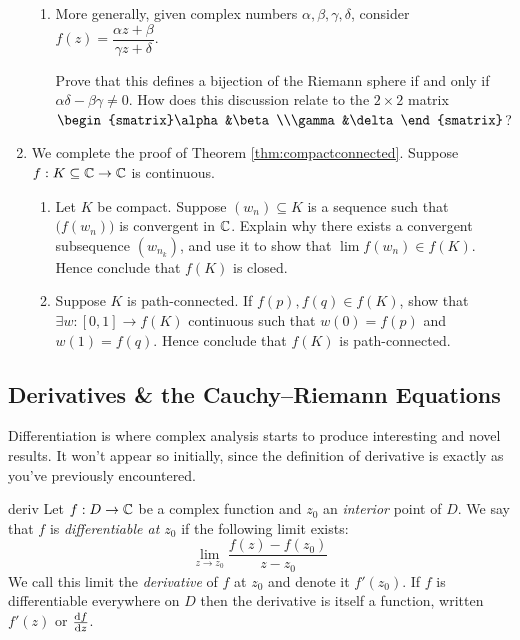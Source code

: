 \begin{exercises}{}{}
\begin{enumerate}
\begin{enumerate}
	  	\item More generally, given complex numbers $\alpha,\beta,\gamma,\delta$, consider $f(z)=\dfrac{\alpha z+\beta}{\gamma z+\delta}$.\par
	  	Prove that this defines a bijection of the Riemann sphere if and only if $\alpha\delta-\beta\gamma\neq 0$. How does this discussion relate to the $2\times 2$ matrix $\begin{smatrix}\alpha&\beta\\\gamma&\delta\end{smatrix}$?
	  \end{enumerate}
	  
	  
	  \item We complete the proof of Theorem \ref{thm:compactconnected}. Suppose $f:K\subseteq\C\to\C$ is continuous.
	  \begin{enumerate}
	    \item Let $K$ be compact. Suppose $(w_n)\subseteq K$ is a sequence such that $\bigl(f(w_n)\bigr)$ is convergent in $\C$. Explain why there exists a convergent subsequence $(w_{n_k})$, and use it to show that $\lim f(w_n)\in f(K)$. Hence conclude that $f(K)$ is closed.
	    
			\item Suppose $K$ is path-connected. If $f(p),f(q)\in f(K)$, show that $\exists w:[0,1]\to f(K)$ continuous such that $w(0)=f(p)$ and $w(1)=f(q)$. Hence conclude that $f(K)$ is path-connected.
	  \end{enumerate}
	\end{enumerate}
\end{exercises}

\clearpage



\subsection{Derivatives \& the Cauchy--Riemann Equations}%

Differentiation is where complex analysis starts to produce interesting and novel results. It won't appear so initially, since the definition of derivative is exactly as you've previously encountered.

\begin{defn}{}{deriv}
	Let $f:D\to\C$ be a complex function and $z_0$ an \emph{interior} point of $D$. We say that $f$ is \emph{differentiable at $z_0$} if the following limit exists:
	\[
		\lim_{z\to z_0}\frac{f(z)-f(z_0)}{z-z_0}
	\]
	We call this limit the \emph{derivative} of $f$ at $z_0$ and denote it $f'(z_0)$. If $f$ is differentiable everywhere\footnotemark{} on $D$ then the derivative is itself a function, written $f'(z)$ or $\diff[f]{z}$. 
\end{defn}

